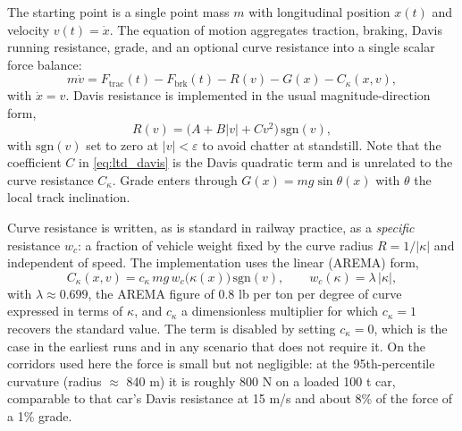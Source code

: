 The starting point is a single point mass $m$ with longitudinal position $x(t)$ and velocity $v(t)=\dot{x}$. The equation of motion aggregates traction, braking, Davis running resistance, grade, and an optional curve resistance into a single scalar force balance:
\begin{equation}
    m\dot{v} = F_{\mathrm{trac}}(t) - F_{\mathrm{brk}}(t) - R(v) - G(x) - C_{\kappa}(x,v),
    \label{eq:ltd_stage1}
\end{equation}
with $\dot{x}=v$. Davis resistance is implemented in the usual magnitude-direction form,
\begin{equation}
    R(v) = \bigl(A + B|v| + C v^2\bigr)\,\mathrm{sgn}(v),
    \label{eq:ltd_davis}
\end{equation}
with $\mathrm{sgn}(v)$ set to zero at $|v|<\varepsilon$ to avoid chatter at standstill. Note that the coefficient $C$ in \cref{eq:ltd_davis} is the Davis quadratic term and is unrelated to the curve resistance $C_{\kappa}$. Grade enters through $G(x)=mg\sin\theta(x)$ with $\theta$ the local track inclination.

Curve resistance is written, as is standard in railway practice, as a \emph{specific} resistance $w_c$: a fraction of vehicle weight fixed by the curve radius $R=1/|\kappa|$ and independent of speed. The implementation uses the linear (AREMA) form,
\begin{equation}
    C_{\kappa}(x,v) = c_{\kappa}\, m g\, w_c\bigl(\kappa(x)\bigr)\,\mathrm{sgn}(v),
    \qquad
    w_c(\kappa) = \lambda\,|\kappa|,
    \label{eq:ltd_curvature}
\end{equation}
with $\lambda \approx 0.699$, the AREMA figure of 0.8 lb per ton per degree of curve expressed in terms of $\kappa$, and $c_{\kappa}$ a dimensionless multiplier for which $c_{\kappa}=1$ recovers the standard value. The term is disabled by setting $c_{\kappa}=0$, which is the case in the earliest runs and in any scenario that does not require it. On the corridors used here the force is small but not negligible: at the 95th-percentile curvature (radius $\approx$ 840 m) it is roughly 800 N on a loaded 100 t car, comparable to that car's Davis resistance at 15 m/s and about 8\% of the force of a 1\% grade.

